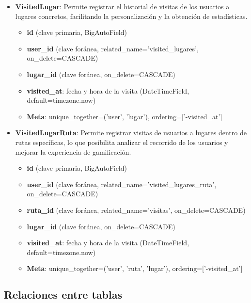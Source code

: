 \begin{itemize}
    \item \textbf{VisitedLugar}: Permite registrar el historial de visitas de los usuarios a lugares concretos, facilitando la personalización y la obtención de estadísticas.
    \begin{itemize}
        \item \textbf{id} (clave primaria, BigAutoField)
        \item \textbf{user\_id} (clave foránea, related\_name='visited\_lugares', on\_delete=CASCADE)
        \item \textbf{lugar\_id} (clave foránea, on\_delete=CASCADE)
        \item \textbf{visited\_at}: fecha y hora de la visita (DateTimeField, default=timezone.now)
        \item \textbf{Meta}: unique\_together=('user', 'lugar'), ordering=['-visited\_at']
    \end{itemize}
    
    \item \textbf{VisitedLugarRuta}: Permite registrar visitas de usuarios a lugares dentro de rutas específicas, lo que posibilita analizar el recorrido de los usuarios y mejorar la experiencia de gamificación.
    \begin{itemize}
        \item \textbf{id} (clave primaria, BigAutoField)
        \item \textbf{user\_id} (clave foránea, related\_name='visited\_lugares\_ruta', on\_delete=CASCADE)
        \item \textbf{ruta\_id} (clave foránea, related\_name='visitas', on\_delete=CASCADE)
        \item \textbf{lugar\_id} (clave foránea, on\_delete=CASCADE)
        \item \textbf{visited\_at}: fecha y hora de la visita (DateTimeField, default=timezone.now)
        \item \textbf{Meta}: unique\_together=('user', 'ruta', 'lugar'), ordering=['-visited\_at']
    \end{itemize}
\end{itemize}

\subsection{Relaciones entre tablas}

